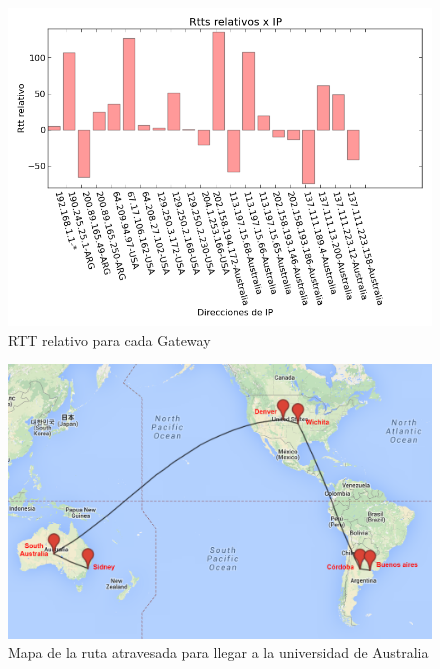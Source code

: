 
\begin{figure}[H]
	\begin{center}
		  \includegraphics[scale=0.5]{../graficos_informe/mq_rtt.png}
		  \caption{RTT relativo para cada Gateway}
		  \label{fig:contra1}
	\end{center}
\end{figure}


\begin{figure}[H]
	\begin{center}
		  \includegraphics[scale=0.4]{../mapas/mapa_md.png}
		  \caption{Mapa de la ruta atravesada para llegar a la universidad de Australia}
		  \label{fig:contra1}
	\end{center}
\end{figure}


